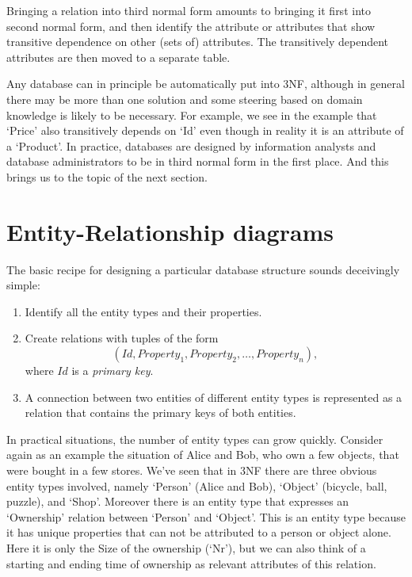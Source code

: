 Bringing a relation into third normal form amounts to bringing it first into
second normal form, and then identify the attribute or attributes that show
transitive dependence on other (sets of) attributes. The transitively dependent
attributes are then moved to a separate table.


Any database can in principle be automatically put into 3NF, although in
general there may be more than one solution and some steering based on domain
knowledge is likely to be necessary.  For example, we see in the example
that `Price' also transitively depends on `Id' even though in reality it
is an attribute of a `Product'. In practice, databases are designed by
information analysts and database administrators to be in third normal form in
the first place.  And this brings us to the topic of the next section. 



\section{Entity-Relationship diagrams}
\label{sect:erd}
The basic recipe for designing a particular database structure sounds deceivingly
simple:
\begin{enumerate}
\item Identify all the entity types and their properties.
\item Create relations with tuples of the form
$$
(Id, Property_1, Property_2,\ldots,Property_n),
$$
where $Id$ is a \emph{primary key}.
\item A connection between two entities of different entity types is
represented as a relation that contains the primary keys of both entities.
\end{enumerate}

In practical situations, the number of entity types can grow quickly.  Consider
again as an example the situation of Alice and Bob, who own a few objects, that
were bought in a few stores. We've seen that in 3NF there are three obvious
entity types involved, namely `Person' (Alice and Bob), `Object' (bicycle,
ball, puzzle), and `Shop'. Moreover there is an entity type that expresses an
`Ownership' relation between `Person' and `Object'. This is an entity type
because it has unique properties that can not be attributed to a person or
object alone. Here it is only the Size of the ownership (`Nr'), but we can also
think of a starting and ending time of ownership as relevant attributes of this
relation.

